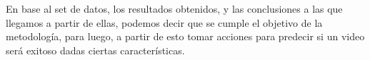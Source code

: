 En base al set de datos, los resultados obtenidos, y las conclusiones a las que
llegamos a partir de ellas, podemos decir que se cumple el objetivo de la
metodología, para luego, a partir de esto tomar acciones para predecir si un
video será exitoso dadas ciertas características.
